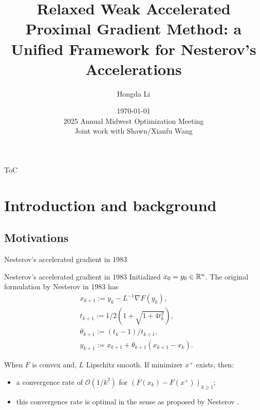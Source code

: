 \documentclass[11pt]{beamer}
\author[Hongda Li]{Hongda Li}
\title{
    Relaxed Weak Accelerated Proximal Gradient Method: a Unified Framework for Nesterov's Accelerations
}
\institute[UBCO]{
    University of British Columbia Okanagan
}
\date[\today]{
    \today 
    \\
    2025 Annual Midwest Optimization Meeting
    \\ 
    \vspace{1cm} \tiny{Joint work with Shawn/Xianfu Wang}
}
\theoremstyle{definition}
\begin{document}
\begin{frame}
    \titlepage
\end{frame}

\begin{frame}{ToC}
    \tableofcontents
\end{frame}

\section{Introduction and background}
    \subsection{Motivations}
        \begin{frame}{Nesterov's accelerated gradient in 1983}
            \begin{block}{Nesterov's accelerated gradient in 1983}
                Initialized $x_0 = y_0 \in \mathbb R^n$. 
                The original formulation by Nesterov in 1983 \cite{nesterov_method_1983} has
                {\small
                \begin{align*}
                    & x_{k + 1} := y_k - L^{-1}\nabla F(y_k),
                    \\
                    & t_{k + 1} := 1/2\left(1 + \sqrt{1 + 4t_{k}^2}\right),
                    \\
                    & \theta_{k + 1} := (t_{k} - 1)/t_{k + 1}, \label{eqn:example-algorithm}
                    \\
                    & y_{k + 1} := x_{k + 1} + \theta_{k + 1}(x_{k + 1} - x_k).
                \end{align*}    
                }
            \end{block}
            When $F$ is convex and, $L$ Lipschitz smooth. 
            If minimizer $x^+$ exists, then: 
            \begin{itemize}
                \item a convergence rate of $\mathcal O(1/k^2)$ for $(F(x_k) - F(x^+))_{k \ge 1}$;
                \item this convergence rate is optimal in the sense as proposed by Nesterov \cite{nesterov_lectures_2018}.
            \end{itemize}
        \end{frame}
\end{document}

